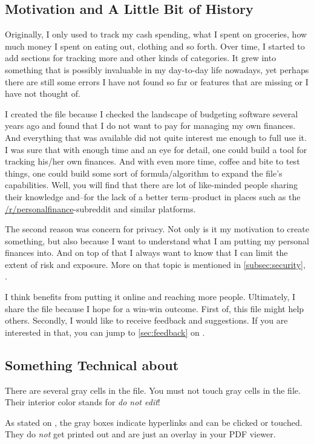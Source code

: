 \subsection{Motivation and A Little Bit of History}
\label{subsec:motivation-history}

Originally, I only used \tfn to track my cash spending, \ie what I spent on groceries, how much money I spent on eating out, clothing and so forth.
Over time, I started to add sections for tracking more and other kinds of categories.
It grew into something that is possibly invaluable in my day-to-day life nowadays, yet perhaps there are still some errors I have not found so far or features that are missing or I have not thought of.

I created the file because I checked the landscape of budgeting software several years ago and found that I do not want to pay for managing my own finances.
And everything that was available did not quite interest me enough to full use it.
I was sure that with enough time and an eye for detail, one could build a tool for tracking his/her own finances.
And with even more time, coffee and bite to test things, one could build some sort of formula/algorithm to expand the file's capabilities.
Well, you will find that there are lot of like-minded people sharing their knowledge and--for the lack of a better term--product in places such as the \href{https://reddit.com/r/personalfinance}{/r/personalfinance}-subreddit and similar platforms.

The second reason was concern for privacy.
Not only is it my motivation to create something, but also because I want to understand what I am putting my personal finances into.
And on top of that I always want to know that I can limit the extent of risk and exposure.
More on that topic is mentioned in \autoref{subsec:security}, .

I think \tfn benefits from putting it online and reaching more people.
Ultimately, I share the file because I hope for a win-win outcome.
First of, this file might help others.
Secondly, I would like to receive feedback and suggestions.
If you are interested in that, you can jump to \autoref{sec:feedback} on .

\subsection{Something Technical about \tfn}
\label{subsec:introduction-something-technical}

There are several gray cells in the file.
You must not touch gray cells in the file.
Their interior color stands for \emph{do not edit}!

As stated on , the gray boxes indicate hyperlinks and can be clicked or touched.
They do \emph{not} get printed out and are just an overlay in your PDF viewer.

